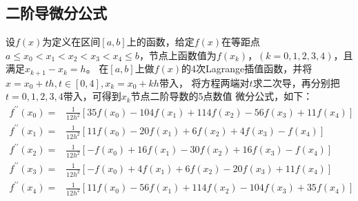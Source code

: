 \subsection{二阶导微分公式}
设$f(x)$为定义在区间$[a,b]$上的函数，给定$f(x)$在等距点$a \leqslant x_0 < x_1 < x_2 < x_3
< x_4 \leqslant b$，节点上函数值为$f(x_k)$，$(k=0, 1, 2, 3, 4)$，且满足$x_{k+1}-x_k=h$。
在$[a,b]$上做$f(x)$的4次Lagrange插值函数，并将$x=x_0+th, t \in [0, 4], x_k = x_0+kh$带入，
将方程两端对$t$求二次导，再分别把$t=0, 1, 2, 3, 4$带入，可得到$x_k$节点二阶导数的5点数值
微分公式，如下：
\begin{equation}
	\begin{aligned}
		f^{\prime\prime}(x_0) =& \frac{1}{12h^2}[35f(x_0) - 104f(x_1) + 114f(x_2) - 56f(x_3) + 11f(x_4)] \\
		f^{\prime\prime}(x_1) =& \frac{1}{12h^2}[11f(x_0) -  20f(x_1) +   6f(x_2) +  4f(x_3) -   f(x_4)] \\
		f^{\prime\prime}(x_2) =& \frac{1}{12h^2}[ -f(x_0) +  16f(x_1) -  30f(x_2) + 16f(x_3) -   f(x_4)] \\
		f^{\prime\prime}(x_3) =& \frac{1}{12h^2}[ -f(x_0) +   4f(x_1) +   6f(x_2) - 20f(x_3) + 11f(x_4)] \\
		f^{\prime\prime}(x_4) =& \frac{1}{12h^2}[11f(x_0) -  56f(x_1) + 114f(x_2) -104f(x_3) + 35f(x_4)]
	\end{aligned}
\end{equation} 




